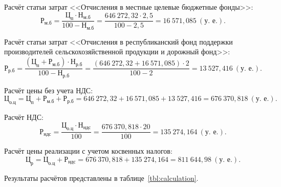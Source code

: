 Расчёт статьи затрат
<<Отчисления в местные целевые бюджетные фонды>>:
\begin{equation*}
\text{Р}_{\text{м.б}} =
\dfrac{
  \text{Ц}_{\text{п}} \cdot \text{Н}_{\text{м.б}}
}{
  100 - \text{Н}_{\text{м.б}}
} =
\dfrac{646~272{,}32 \cdot 2{,}5 }{100 - 2{,}5} = 16~571{,}085 ~ (\text{у.~е.}).
\end{equation*}

Расчёт статьи затрат
<<Отчисления в республиканский фонд поддержки производителей
сельскохозяйственной продукции и дорожный фонд>>:
\begin{equation*}
\text{Р}_{\text{р.б}} =
\dfrac{
  (\text{Ц}_{\text{п}} + \text{Р}_{\text{м.б}}) \cdot \text{Н}_{\text{р.б}}
}{
  100 - \text{Н}_{\text{р.б}}
} =
\dfrac{(646~272{,}32 + 16~571{,}085) \cdot 2}{100 - 2} = 13~527{,}416 ~ (\text{у.~е.}).
\end{equation*}

Расчёт цены без учета НДС:
\begin{equation*}
\text{Ц}_{\text{о.ц}} =
\text{Ц}_{\text{п}} + \text{Р}_{\text{м.б}} + \text{Р}_{\text{р.б}} =
646~272{,}32 + 16~571{,}085 + 13~527{,}416 = 676~370{,}818 \: (\text{у.~е.}).
\end{equation*}

Расчёт НДС:
\begin{equation*}
\text{Р}_{\text{ндс}} =
\dfrac{
  \text{Ц}_{\text{о.ц}} \cdot \text{Н}_{\text{ндс}}
}{
  100
} =
\dfrac{676~370{,}818 \cdot 20}{100} = 135~274{,}164 \: (\text{у.~е.}).
\end{equation*}

Расчёт цены реализации с учетом косвенных налогов:
\begin{equation*}
\text{Ц}_{\text{р}} =
\text{Ц}_{\text{о.ц}} + \text{Р}_{\text{ндс}} =
676~370{,}818 + 135~274{,}164 = 811~644{,}98 ~ (\text{у.~е.}).
\end{equation*}

Результаты расчётов представлены в таблице~\ref{tbl:calculation}.

